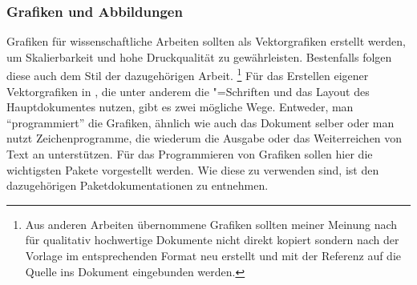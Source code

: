 \documentclass[%
  english,ngerman,%
  headings=optiontoheadandtoc,captions=tableheading,numbers=noenddot,%
  chapterpage,cdfoot,%
]{tudscrman}
\begin{document}
\subsubsection{Grafiken und Abbildungen}
Grafiken für wissenschaftliche Arbeiten sollten als Vektorgrafiken erstellt 
werden, um Skalierbarkeit und hohe Druckqualität zu gewährleisten. Bestenfalls 
folgen diese auch dem Stil der dazugehörigen Arbeit.%
\footnote{%
  Aus anderen Arbeiten übernommene Grafiken sollten meiner Meinung nach für 
  qualitativ hochwertige Dokumente nicht direkt kopiert sondern nach der Vorlage 
  im entsprechenden Format neu erstellt und mit der Referenz auf die Quelle ins 
  Dokument eingebunden werden.
}
Für das Erstellen eigener Vektorgrafiken in , die unter anderem 
die "=Schriften und das Layout des Hauptdokumentes nutzen, gibt
es zwei mögliche Wege. Entweder, man \enquote{programmiert} die Grafiken, 
ähnlich wie auch das Dokument selber oder man nutzt Zeichenprogramme, die 
wiederum die Ausgabe oder das Weiterreichen von Text an  
unterstützen. Für das Programmieren von Grafiken sollen hier die wichtigsten 
Pakete vorgestellt werden. Wie diese zu verwenden sind, ist den dazugehörigen 
Paketdokumentationen zu entnehmen.
\end{document}
